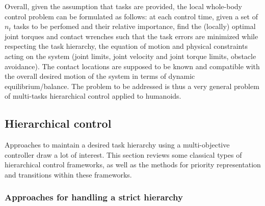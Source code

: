 \documentclass[12pt,a4paper,twoside]{article}
\begin{document}
Overall, given the assumption that tasks are provided, the local whole-body control problem can be formulated as follows: at each control time, given a set of $n_t$ tasks to be perfomed and their relative importance, find the (locally) optimal joint torques and contact wrenches such that the task errors are minimized while respecting the task hierarchy, the equation of motion and physical constraints acting on the system (joint limits, joint velocity and joint torque limits, obstacle avoidance). The contact locations are supposed to be known and compatible with the overall desired motion of the system in terms of dynamic equilibrium/balance. The problem to be addressed is thus a very general problem of multi-tasks hierarchical control applied to humanoids.

\subsection{Hierarchical control}

Approaches to maintain a desired task hierarchy using a multi-objective controller draw a lot of interest. This section reviews some classical types of hierarchical control frameworks, as well as the methods for priority representation and transitions within these frameworks.

\subsubsection{Approaches for handling a strict hierarchy}
\label{sec:Approaches for handling a strict hierarchy}
\end{document}
